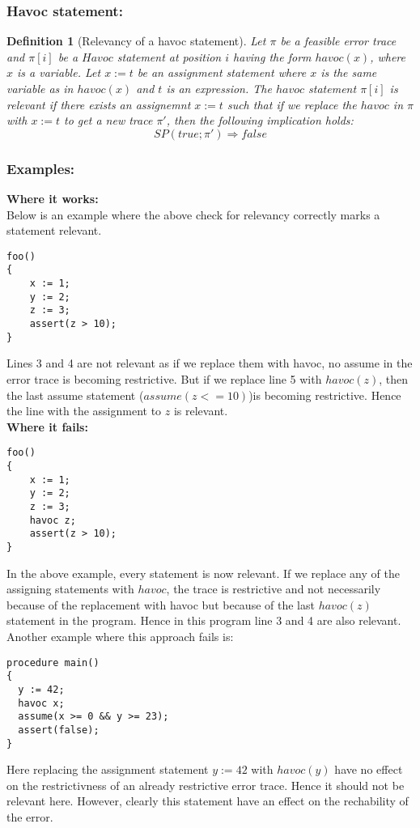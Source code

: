 \documentclass{article}
\newtheorem{mydef}{Definition}
\begin{document}
\subsubsection{Havoc statement:}
\begin{mydef}[Relevancy of a havoc statement]
Let $\pi$ be a feasible error trace and $\pi[i]$ be a $Havoc$ statement at position $i$ having the form $havoc(x)$, where $x$ is a variable. Let $x:=t$ be an assignment statement where $x$ is the same variable as in $havoc(x)$ and $t$ is an expression. The $havoc$ statement $\pi[i]$ is relevant if there exists an assignemnt $x:=t$ such that if we replace the $havoc$ in $\pi$ with $x:=t$ to get a new trace $\pi'$, then the following implication holds:
$$SP(true; \pi') \Rightarrow false$$
\end{mydef}


\subsubsection{Examples:}
\textbf{Where it works:} \\
Below is an example where the above check for relevancy correctly marks a statement relevant.
\begin{lstlisting}
foo()
{
	x := 1;
	y := 2;
	z := 3;
	assert(z > 10);
}
\end{lstlisting}
Lines 3 and 4 are not relevant as if we replace them with havoc, no assume in the error trace is becoming restrictive. But if we replace line 5 with $havoc(z)$, then the last assume statement ($assume(z<=10)$)is becoming restrictive. Hence the line with the assignment to $z$ is relevant. \\
\textbf{Where it fails:}
\begin{lstlisting}
foo()
{
	x := 1;
	y := 2;
	z := 3;
	havoc z;
	assert(z > 10);
}
\end{lstlisting}
In the above example, every statement is now relevant. If we replace any of the assigning statements with $havoc$, the trace is restrictive and not necessarily because of the replacement with havoc but because of the last $havoc(z)$ statement in the program. Hence in this program line 3 and 4 are also relevant.\\
Another example where this approach fails is:
\begin{lstlisting}
procedure main()
{
  y := 42;
  havoc x;
  assume(x >= 0 && y >= 23);
  assert(false);
}
\end{lstlisting}
Here replacing the assignment statement $y:=42$ with $havoc(y)$ have no effect on the restrictivness of an already restrictive error trace. Hence it should not be relevant here. However, clearly this statement have an effect on the rechability of the error.
\end{document}
